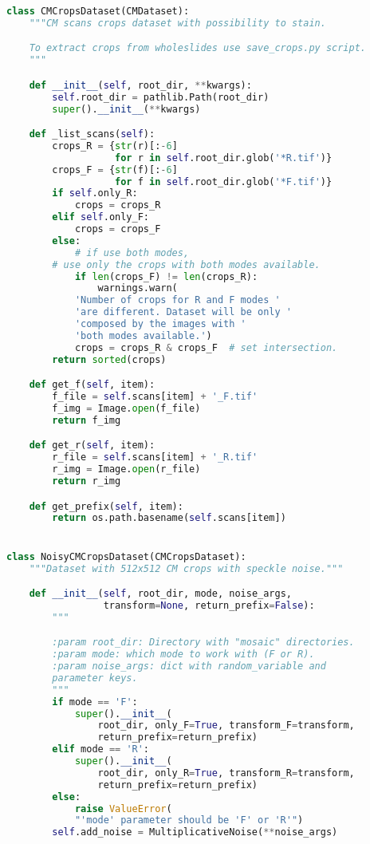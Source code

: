 \documentclass[../main.tex]{subfiles}
\begin{document}
\begin{lstlisting}[language=Python]
class CMCropsDataset(CMDataset):
    """CM scans crops dataset with possibility to stain.

    To extract crops from wholeslides use save_crops.py script.
    """

    def __init__(self, root_dir, **kwargs):
        self.root_dir = pathlib.Path(root_dir)
        super().__init__(**kwargs)

    def _list_scans(self):
        crops_R = {str(r)[:-6]
                   for r in self.root_dir.glob('*R.tif')}
        crops_F = {str(f)[:-6]
                   for f in self.root_dir.glob('*F.tif')}
        if self.only_R:
            crops = crops_R
        elif self.only_F:
            crops = crops_F
        else:
            # if use both modes,
	    # use only the crops with both modes available.
            if len(crops_F) != len(crops_R):
                warnings.warn(
			'Number of crops for R and F modes '
			'are different. Dataset will be only '
			'composed by the images with '
			'both modes available.')
            crops = crops_R & crops_F  # set intersection.
        return sorted(crops)

    def get_f(self, item):
        f_file = self.scans[item] + '_F.tif'
        f_img = Image.open(f_file)
        return f_img

    def get_r(self, item):
        r_file = self.scans[item] + '_R.tif'
        r_img = Image.open(r_file)
        return r_img

    def get_prefix(self, item):
        return os.path.basename(self.scans[item])


class NoisyCMCropsDataset(CMCropsDataset):
    """Dataset with 512x512 CM crops with speckle noise."""

    def __init__(self, root_dir, mode, noise_args,
                 transform=None, return_prefix=False):
        """

        :param root_dir: Directory with "mosaic" directories.
        :param mode: which mode to work with (F or R).
        :param noise_args: dict with random_variable and
		parameter keys.
        """
        if mode == 'F':
            super().__init__(
                root_dir, only_F=True, transform_F=transform,
                return_prefix=return_prefix)
        elif mode == 'R':
            super().__init__(
                root_dir, only_R=True, transform_R=transform,
                return_prefix=return_prefix)
        else:
            raise ValueError(
	    	"'mode' parameter should be 'F' or 'R'")
        self.add_noise = MultiplicativeNoise(**noise_args)


\end{lstlisting}
\end{document}
